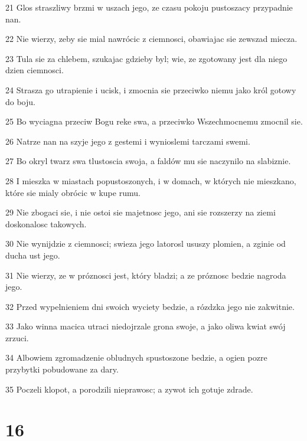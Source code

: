 \par 21 Glos straszliwy brzmi w uszach jego, ze czasu pokoju pustoszacy przypadnie nan.
\par 22 Nie wierzy, zeby sie mial nawrócic z ciemnosci, obawiajac sie zewszad miecza.
\par 23 Tula sie za chlebem, szukajac gdzieby byl; wie, ze zgotowany jest dla niego dzien ciemnosci.
\par 24 Strasza go utrapienie i ucisk, i zmocnia sie przeciwko niemu jako król gotowy do boju.
\par 25 Bo wyciagna przeciw Bogu reke swa, a przeciwko Wszechmocnemu zmocnil sie.
\par 26 Natrze nan na szyje jego z gestemi i wynioslemi tarczami swemi.
\par 27 Bo okryl twarz swa tlustoscia swoja, a faldów mu sie naczynilo na slabiznie.
\par 28 I mieszka w miastach popustoszonych, i w domach, w których nie mieszkano, które sie mialy obrócic w kupe rumu.
\par 29 Nie zbogaci sie, i nie ostoi sie majetnosc jego, ani sie rozszerzy na ziemi doskonalosc takowych.
\par 30 Nie wynijdzie z ciemnosci; swieza jego latorosl ususzy plomien, a zginie od ducha ust jego.
\par 31 Nie wierzy, ze w próznosci jest, który bladzi; a ze próznosc bedzie nagroda jego.
\par 32 Przed wypelnieniem dni swoich wyciety bedzie, a rózdzka jego nie zakwitnie.
\par 33 Jako winna macica utraci niedojrzale grona swoje, a jako oliwa kwiat swój zrzuci.
\par 34 Albowiem zgromadzenie obludnych spustoszone bedzie, a ogien pozre przybytki pobudowane za dary.
\par 35 Poczeli klopot, a porodzili nieprawosc; a zywot ich gotuje zdrade.

\chapter{16}

